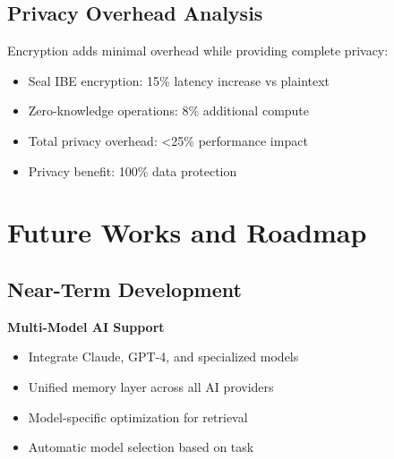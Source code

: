 \documentclass[12pt, a4paper]{article}
\begin{document}
\subsection{Privacy Overhead Analysis}

Encryption adds minimal overhead while providing complete privacy:

\begin{itemize}
    \item Seal IBE encryption: 15\% latency increase vs plaintext
    \item Zero-knowledge operations: 8\% additional compute
    \item Total privacy overhead: <25\% performance impact
    \item Privacy benefit: 100\% data protection
\end{itemize}
\newpage
\section{Future Works and Roadmap}

\subsection{Near-Term Development }

\textbf{Multi-Model AI Support}
\begin{itemize}
    \item Integrate Claude, GPT-4, and specialized models
    \item Unified memory layer across all AI providers
    \item Model-specific optimization for retrieval
    \item Automatic model selection based on task
\end{itemize}


\end{document}
